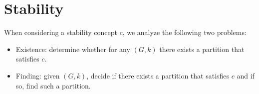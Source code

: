 \documentclass[sigconf]{aamas}
\begin{document}
\section{Stability}
When considering a stability concept $c$, we analyze the following two problems:
\begin{itemize}
    \item Existence: determine whether for any $(G,k)$ there exists a partition that satisfies $c$.
    \item Finding: given $(G,k)$, decide if there exists a partition that satisfies $c$ and if so, find such a partition.
\end{itemize}



    
\end{document}
